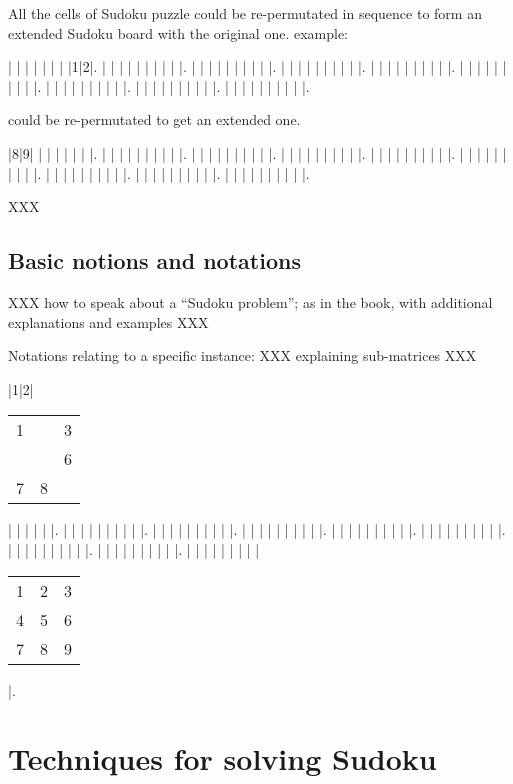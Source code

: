 \documentclass[11pt]{report}
\newcommand{\cell}[9]{%
  \scriptsize
  \setlength{\tabcolsep}{1pt}
  \renewcommand{\arraystretch}{0.5}
  \hspace{-0.6em}
  \begin{tabular}{ccc}
    #1 & #2 & #3\\
    #4 & #5 & #6\\
    #7 & #8 & #9
  \end{tabular}
}
\begin{document}
All the cells of Sudoku puzzle could be re-permutated in sequence to form an extended Sudoku board with the original one.
example:
\begin{sudoku}
   | | | | | | | |1|2|.
   | | | | | | | | | |.
   | | | | | | | | | |.
   | | | | | | | | | |.
   | | | | | | | | | |.
   | | | | | | | | | |.
   | | | | | | | | | |.
   | | | | | | | | | |.
   | | | | | | | | | |.
\end{sudoku}
could be re-permutated to get an extended one.
\begin{sudoku}
\label{p48}
   |8|9| | | | | | | |.
   | | | | | | | | | |.
   | | | | | | | | | |.
   | | | | | | | | | |.
   | | | | | | | | | |.
   | | | | | | | | | |.
   | | | | | | | | | |.
   | | | | | | | | | |.
   | | | | | | | | | |.
\end{sudoku}

\cite{Berthier2007Sudoku} XXX





\section{Basic notions and notations}
\label{sec:basicnotnotat}

XXX how to speak about a ``Sudoku problem''; as in the book, with additional explanations and examples XXX

Notations relating to a specific instance: XXX explaining sub-matrices XXX
\begin{sudoku}
\label{p48}
   |1|2|
   {\cell 1{}3{}{}678{} }
   | | | | | |.
   | | | | | | | | | |.
   | | | | | | | | | |.
   | | | | | | | | | |.
   | | | | | | | | | |.
   | | | | | | | | | |.
   | | | | | | | | | |.
   | | | | | | | | | |.
   | | | | | | | | | {\cell 123456789} |.
\end{sudoku}







\chapter{Techniques for solving Sudoku}
\label{sec:Techniques}
\end{document}
